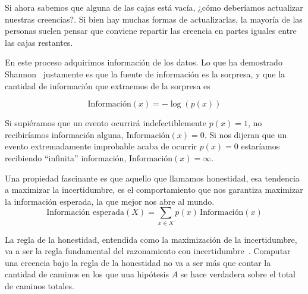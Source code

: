 \documentclass[a4paper,10pt]{article}
\begin{document}
Si ahora sabemos que alguna de las cajas está vacía, ¿cómo deberíamos actualizar nuestras creencias?.
Si bien hay muchas formas de actualizarlas, la mayoría de las personas suelen pensar que conviene repartir las creencia en partes iguales entre las cajas restantes.

\begin{figure}[H]     
    \centering \small
    \begin{subfigure}[b]{0.49\textwidth}
    \centering
    \end{subfigure}    
\end{figure}

En este proceso adquirimos información de los datos.
Lo que ha demostrado Shannon~\cite{shannon1948-theoryOfCommunication} justamente es que la fuente de informaci\'on es la sorpresa, y que la cantidad de informaci\'on que extraemos de la sorpresa es

\begin{equation}
 \text{Informaci\'on}(x) = - \log(p(x))  
\end{equation}

Si supiéramos que un evento ocurrir\'a indefectiblemente $p(x)=1$, no recibiríamos información alguna, $\text{Informaci\'on}(x)=0$.
Si nos dijeran que un evento extremadamente improbable acaba de ocurrir $p(x) = 0$ estar\'iamos recibiendo ``infinita'' informaci\'on, $\text{Informaci\'on}(x) = \infty$.

Una propiedad fascinante es que aquello que llamamos honestidad, esa tendencia a maximizar la incertidumbre, es el comportamiento que nos garantiza maximizar la informaci\'on esperada, la que mejor nos abre al mundo.
\begin{equation}
 \text{Informaci\'on esperada}(X) = \sum_{x \in X} p(x) \, \text{Informaci\'on}(x) 
\end{equation}

La regla de la honestidad, entendida como la maximizaci\'on de la incertidumbre, va a ser la regla fundamental del razonamiento con incertidumbre~\cite{jaynes1957-informationTheoryAndStatisticalMechanics}.
Computar una creencia bajo la regla de la honestidad no va a ser m\'as que contar la cantidad de caminos en los que una hip\'otesis $A$ se hace verdadera sobre el total de caminos totales.
\end{document}
